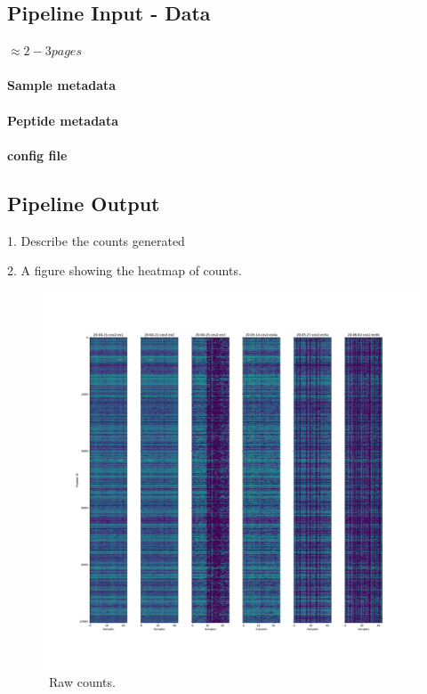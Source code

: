 \documentclass{article}
\begin{document}
\subsection*{Pipeline Input - Data}

$\approx 2 - 3 pages$

\paragraph{Sample metadata}
\paragraph{Peptide metadata}
\paragraph{config file}

\subsection*{Pipeline Output}

1. Describe the counts generated

2. A figure showing the heatmap of counts.

 \begin{figure}[h!!!!]
 \centering
 \includegraphics[width=1.0\textwidth]{figures/raw_counts.pdf}
 \caption{ \
 Raw counts.
 }
 \label{fig:raw_counts}
 \end{figure}
\end{document}
